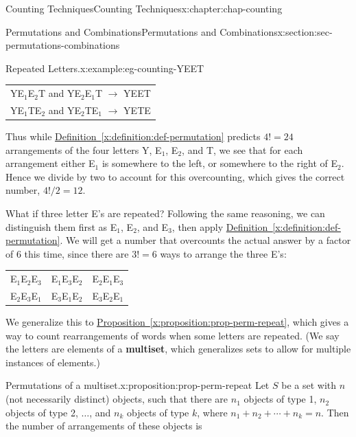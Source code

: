 \documentclass[oneside,10pt,]{book}
\newcommand{\tabularfont}{\relax}
\newcommand{\xreffont}{\relax}
\newcommand{\terminology}[1]{\textbf{#1}}
\numberwithin{equation}{section}
\begin{document}
\begin{chapterptx}{Counting Techniques}{}{Counting Techniques}{}{}{x:chapter:chap-counting}
\begin{sectionptx}{Permutations and Combinations}{}{Permutations and Combinations}{}{}{x:section:sec-permutations-combinations}
\begin{example}{Repeated Letters.}{x:example:eg-counting-YEET}
\begin{sidebyside}{1}{0.15}{0.15}{0}%
\begin{sbspanel}{0.7}%
{\centering%
{\tabularfont%
\begin{tabular}{l}
YE\(_1\)E\(_2\)T and YE\(_2\)E\(_1\)T \(\rightarrow\) YEET\tabularnewline[0pt]
YE\(_1\)TE\(_2\) and YE\(_2\)TE\(_1\) \(\rightarrow\) YETE
\end{tabular}
}%
\par}
\end{sbspanel}%
\end{sidebyside}%
\par
Thus while \hyperref[x:definition:def-permutation]{Definition~{\xreffont\ref{x:definition:def-permutation}}} predicts \(4! = 24\) arrangements of the four letters Y, E\(_1\), E\(_2\), and T, we see that for each arrangement either E\(_1\) is somewhere to the left, or somewhere to the right of E\(_2\). Hence we divide by two to account for this overcounting, which gives the correct number, \(4!/2 = 12\).%
\end{example}
What if three letter E's are repeated? Following the same reasoning, we can distinguish them first as E\(_1\), E\(_2\), and E\(_3\), then apply \hyperref[x:definition:def-permutation]{Definition~{\xreffont\ref{x:definition:def-permutation}}}. We will get a number that overcounts the actual answer by a factor of 6 this time, since there are \(3! = 6\) ways to arrange the three E's:%
\begin{sidebyside}{1}{0.1}{0.1}{0}%
\begin{sbspanel}{0.8}%
{\centering%
{\tabularfont%
\begin{tabular}{lll}
E\(_1\)E\(_2\)E\(_3\)&E\(_1\)E\(_3\)E\(_2\)&E\(_2\)E\(_1\)E\(_3\)\tabularnewline[0pt]
E\(_2\)E\(_3\)E\(_1\)&E\(_3\)E\(_1\)E\(_2\)&E\(_3\)E\(_2\)E\(_1\)
\end{tabular}
}%
\par}
\end{sbspanel}%
\end{sidebyside}%
\par
We generalize this to \hyperref[x:proposition:prop-perm-repeat]{Proposition~{\xreffont\ref{x:proposition:prop-perm-repeat}}}, which gives a way to count rearrangements of words when some letters are repeated. (We say the letters are elements of a \terminology{multiset}, which generalizes sets to allow for multiple instances of elements.)%
\begin{proposition}{Permutations of a multiset.}{}{x:proposition:prop-perm-repeat}%
Let \(S\) be a set with \(n\) (not necessarily distinct) objects, such that there are \(n_1\) objects of type 1, \(n_2\) objects of type 2, \(\ldots\), and \(n_k\) objects of type \(k\), where \(n_1 + n_2 + \cdots + n_k = n\). Then the number of arrangements of these objects is%

\end{proposition}
\end{sectionptx}
\end{chapterptx}
\end{document}
